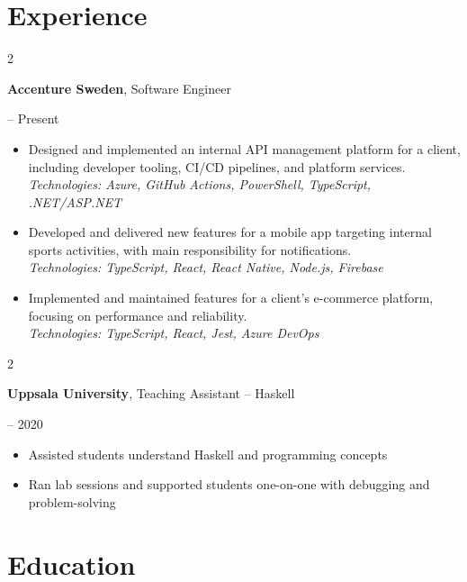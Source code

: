 \documentclass[10pt, letterpaper]{article}
\newenvironment{highlights}{
    \begin{itemize}[
        topsep=0.10 cm,
        parsep=0.10 cm,
        partopsep=0pt,
        itemsep=0pt,
        leftmargin=0.4 cm + 10pt
    ]
}{
    \end{itemize}
} %
\newenvironment{twocolentry}[2][]{
    \onecolentry
    \def\secondColumn{#2}
    \setcolumnwidth{\fill, 4.5 cm}
    \begin{paracol}{2}
}{
    \switchcolumn \raggedleft \secondColumn
    \end{paracol}
    \endonecolentry
} %
\begin{document}
    \section{Experience}
    \begin{twocolentry}{
            2023 – Present
        }
        \textbf{Accenture Sweden}, Software Engineer
    \end{twocolentry}
    \begin{highlights}
        \item Designed and implemented an internal API management platform for a client, including developer tooling, CI/CD pipelines, and platform services. \\
            \small{\textit{Technologies: Azure, GitHub Actions, PowerShell, TypeScript, .NET/ASP.NET}}
        \item Developed and delivered new features for a mobile app targeting internal sports activities, with main responsibility for notifications. \\
            \small{\textit{Technologies: TypeScript, React, React Native, Node.js, Firebase}}
        \item Implemented and maintained features for a client’s e-commerce platform, focusing on performance and reliability. \\
            \small{\textit{Technologies: TypeScript, React, Jest, Azure DevOps}}
    \end{highlights}
    
    \vspace{0.2 cm}
    
    \begin{twocolentry}{
            2019 – 2020
        }
        \textbf{Uppsala University}, Teaching Assistant – Haskell
    \end{twocolentry}
        \begin{highlights}
            \item Assisted students understand Haskell and programming concepts
            \item Ran lab sessions and supported students one-on-one with debugging and problem-solving
        \end{highlights}
    
    \section{Education}
    
\end{document}
